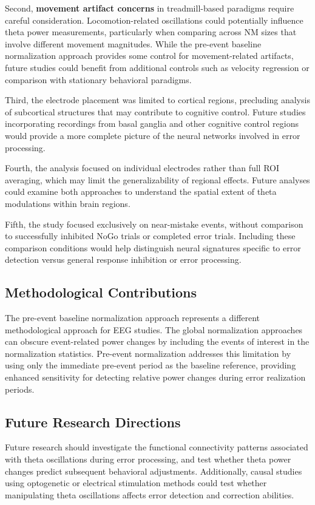 \documentclass[11pt]{article}
\begin{document}
Second, \textbf{movement artifact concerns} in treadmill-based paradigms require careful consideration. Locomotion-related oscillations could potentially influence theta power measurements, particularly when comparing across NM sizes that involve different movement magnitudes. While the pre-event baseline normalization approach provides some control for movement-related artifacts, future studies could benefit from additional controls such as velocity regression or comparison with stationary behavioral paradigms.

Third, the electrode placement was limited to cortical regions, precluding analysis of subcortical structures that may contribute to cognitive control. Future studies incorporating recordings from basal ganglia and other cognitive control regions would provide a more complete picture of the neural networks involved in error processing.

Fourth, the analysis focused on individual electrodes rather than full ROI averaging, which may limit the generalizability of regional effects. Future analyses could examine both approaches to understand the spatial extent of theta modulations within brain regions.

Fifth, the study focused exclusively on near-mistake events, without comparison to successfully inhibited NoGo trials or completed error trials. Including these comparison conditions would help distinguish neural signatures specific to error detection versus general response inhibition or error processing.

\subsection{Methodological Contributions}

The pre-event baseline normalization approach represents a different methodological approach for EEG studies. The global normalization approaches can obscure event-related power changes by including the events of interest in the normalization statistics. Pre-event normalization addresses this limitation by using only the immediate pre-event period as the baseline reference, providing enhanced sensitivity for detecting relative power changes during error realization periods.

\subsection{Future Research Directions}

Future research should investigate the functional connectivity patterns associated with theta oscillations during error processing, and test whether theta power changes predict subsequent behavioral adjustments. Additionally, causal studies using optogenetic or electrical stimulation methods could test whether manipulating theta oscillations affects error detection and correction abilities.
\end{document}
